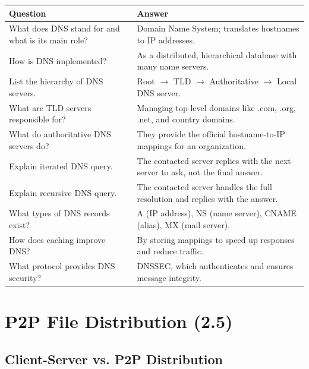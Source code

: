 \begin{exambox}
\small
\begin{longtable}{p{7cm}p{7cm}}
\toprule
\textbf{Question} & \textbf{Answer} \\
\midrule
\endhead
What does DNS stand for and what is its main role? & Domain Name System; translates hostnames to IP addresses. \\
\midrule
How is DNS implemented? & As a distributed, hierarchical database with many name servers. \\
\midrule
List the hierarchy of DNS servers. & Root $\rightarrow$ TLD $\rightarrow$ Authoritative $\rightarrow$ Local DNS server. \\
\midrule
What are TLD servers responsible for? & Managing top-level domains like .com, .org, .net, and country domains. \\
\midrule
What do authoritative DNS servers do? & They provide the official hostname-to-IP mappings for an organization. \\
\midrule
Explain iterated DNS query. & The contacted server replies with the next server to ask, not the final answer. \\
\midrule
Explain recursive DNS query. & The contacted server handles the full resolution and replies with the answer. \\
\midrule
What types of DNS records exist? & A (IP address), NS (name server), CNAME (alias), MX (mail server). \\
\midrule
How does caching improve DNS? & By storing mappings to speed up responses and reduce traffic. \\
\midrule
What protocol provides DNS security? & DNSSEC, which authenticates and ensures message integrity. \\
\bottomrule
\end{longtable}
\end{exambox}


\newpage
\section{P2P File Distribution (2.5)}

\subsection{Client-Server vs. P2P Distribution}

